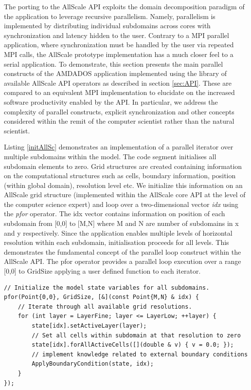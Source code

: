 \documentclass[acmsmall,review,anonymous]{acmart}\settopmatter{printfolios=true,printccs=false,printacmref=false}
\begin{document}
The porting to the AllScale API exploits the domain decomposition paradigm of the application to leverage recursive parallelism. Namely, parallelism is implemented by distributing individual subdomains across cores with synchronization and latency hidden to the user. Contrary to a MPI parallel application, where synchronization must be handled by the user via repeated MPI calls, the AllScale prototype implementation has a much closer feel to a serial application. To demonstrate, this section presents the main parallel constructs of the AMDADOS application implemented using the library of available AllScale API operators as described in section \ref{sec:API}. These are compared to an equivalent MPI implementation to elucidate on the increased software productivity enabled by the API. In particular, we address the complexity of parallel constructs, explicit synchronization and other concepts considered within the remit of the computer scientist rather than the natural scientist.

Listing \ref{initAllSc} demonstrates an implementation of a parallel iterator over multiple subdomains within the model. The code segment initialises all subdomain elements to zero. Grid structures are created containing information on the computational structures such as cells, boundary information, position (within global domain), resolution level etc. We initialize this information on an AllScale grid structure (implemented within the AllScale core API at the level of the computer science expert) and loop over a two-dimensional vector \textit{idx} using the \textit{pfor} operator. The idx vector contains information on position of each subdomain from [0,0] to [M,N] where M and N are number of subdomains in x and y respectively. Since the application enables multiple levels of horizontal resolution within each subdomain, initialisation proceeds for all levels. This demonstrates the fundamental concept of the parallel loop construct within the AllScale API. The pfor operator provides a parallel loop execution over a range [0,0] to GridSize applying a user defined function to each iterator.

\begin{lstlisting}[caption=Sample code to initialize concentrations on all subdomains to zero by means of a parallel loop construct using the pfor operator
, label=initAllSc]
// Initialize the model state variables for all subdomains.
pfor(Point{0,0}, GridSize, [&](const Point{M,N} & idx) {
    // Iterate through all available grid resolutions.
    for (int layer = LayerFine; layer <= LayerLow; ++layer) {
        state[idx].setActiveLayer(layer);
        // Set all cells within subdomain at that resolution to zero
        state[idx].forAllActiveCells([](double & v) { v = 0.0; });
        // implement knowledge related to external boundary conditions
        ApplyBoundaryCondition(state, idx);
    }
});
\end{lstlisting}
\end{document}
